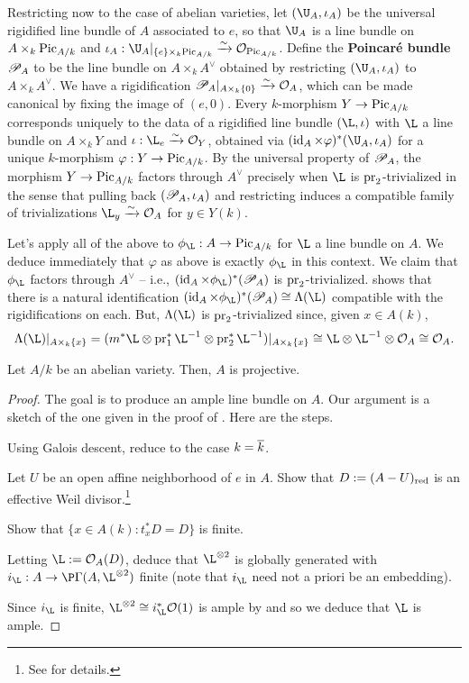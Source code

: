 \documentclass[11pt]{article}
\begin{document}
Restricting now to the case of abelian varieties, let $(\U_A,\iota_A)$ be the universal rigidified line bundle of $A$ associated to $e$, so that $\U_A$ is a line bundle on $A\times_k\operatorname{Pic}_{A/k}$ and $\iota_A: \U_A|_{\{e\}\times_k\Pic_{A/k}}\xto{\sim}\O_{\Pic_{A/k}}$. Define the \textbf{Poincar\'{e} bundle} $\mathscr{P}_A$ to be the line bundle on $A\times_kA^{\vee}$ obtained by restricting $(\U_A,\iota_A)$ to $A\times_kA^{\vee}$. We have a rigidification $\mathscr{P}_A|_{A\times_k\{0\}}\xrightarrow{\sim}\mathcal{O}_A$, which can be made canonical by fixing the image of $(e,0)$. Every $k$-morphism $Y\to\operatorname{Pic}_{A/k}$ corresponds uniquely to the data of a rigidified line bundle $(\L,\iota)$ with $\L$ a line bundle on $A\times_kY$ and $\iota: \L_e\xto{\sim}\O_Y$, obtained via $(\id_A\times\varphi)^*(\U_A,\iota_A)$ for a unique $k$-morphism $\varphi: Y\to\operatorname{Pic}_{A/k}$. By the universal property of $\mathscr{P}_A$, the morphism $Y\to\operatorname{Pic}_{A/k}$ factors through $A^{\vee}$ precisely when $\L$ is $\operatorname{pr}_2$-trivialized in the sense that pulling back $(\mathscr{P}_A,\iota_A)$ and restricting induces a compatible family of trivializations $\L_y\xto{\sim}\O_A$ for $y\in Y(k)$. 

Let's apply all of the above to $\phi_{\L}: A\to\Pic_{A/k}$ for $\L$ a line bundle on $A$. We deduce immediately that $\varphi$ as above is exactly $\phi_{\L}$ in this context. We claim that $\phi_{\L}$ factors through $A^{\vee}$ -- i.e., $(\id_A\times\phi_{\L})^*(\ms{P}_A)$ is $\operatorname{pr}_2$-trivialized. \cite[\textrm{Prop 3.3.1}]{Conrad} shows that there is a natural identification $(\id_A\times\phi_{\L})^*(\ms{P}_A)\iso\Lambda(\L)$ compatible with the rigidifications on each. But, $\Lambda(\L)$ is $\operatorname{pr}_2$-trivialized since, given $x\in A(k)$, 
$$\Lambda(\L)|_{A\times_k\{x\}}=(m^*\L\tensor\pr_1^*\L^{-1}\tensor\pr_2^*\L^{-1})|_{A\times_k\{x\}}\iso\L\tensor\L^{-1}\tensor\O_A\iso\O_A.$$

\begin{theorem}\label{Projectivity_Thm}
Let $A/k$ be an abelian variety. Then, $A$ is projective.
\end{theorem}

\begin{proof}
The goal is to produce an ample line bundle on $A$. Our argument is a sketch of the one given in the proof of \cite[\textrm{Thm 3.4.1}]{Conrad}. Here are the steps.
\begin{enum}{\arabic}
\item Using Galois descent, reduce to the case $k=\overline{k}$.
\item Let $U$ be an open affine neighborhood of $e$ in $A$. Show that $D:=(A-U)_{\operatorname{red}}$ is an effective Weil divisor.\footnote{See \cite[Lemma 10.10]{Bhatt} for details.}
\item Show that $\{x\in A(k) : t_x^*D=D\}$ is finite.
\item Letting $\L:=\O_A(D)$, deduce that $\L^{\tensor2}$ is globally generated with $i_{\L}: A\to\P\Gamma(A,\L^{\tensor2})$ finite (note that $i_{\L}$ need not a priori be an embedding).
\end{enum}
Since $i_{\L}$ is finite, $\L^{\tensor2}\iso i_{\L}^*\O(1)$ is ample by \cite[\textrm{Tag 0B5V}]{Stack} and so we deduce that $\L$ is ample.
\end{proof}
\end{document}
